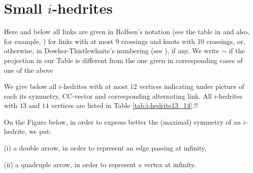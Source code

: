 \documentclass[12pt]{article}
\begin{document}
\section{Small $i$-hedrites}

Here and below all links are given 
in Rolfsen's notation (see the table in \cite{Rolf} and also,  
for example, \cite{Kaw}) for links with at most 9 
crossings and knots with 10 crossings, or, otherwise, in
Dowker-Thistlewhaite's numbering (see \cite{T}), if any.
We write $\sim$ if the projection in our Table is different 
from the one given in corresponding cases of one of the above 

We give below all $i$-hedrites with at most $12$ vertices indicating under 
picture of each its symmetry, CC-vector and corresponding alternating link.
All $i$-hedrites with $13$ and $14$ vertices are listed in Table \ref{tab:i-hedrite13_14}.!!


On the Figure below, in order to express better the (maximal)
symmetry of an $i$-hedrite, we put:

(i) a double arrow, in order to represent an edge passing at infinity,

(ii) a quadruple arrow, in order to represent a vertex at infinity.
\end{document}

